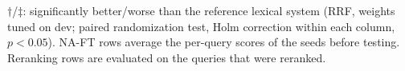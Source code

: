 \begin{table}[t]
\vspace{2pt}
\parbox{\textwidth}{\footnotesize $\dagger$/$\ddagger$: significantly better/worse than the reference lexical system (RRF, weights tuned on dev; paired randomization test, Holm correction within each column, $p<0.05$). NA-FT rows average the per-query scores of the seeds before testing. Reranking rows are evaluated on the queries that were reranked.}
\end{table}

